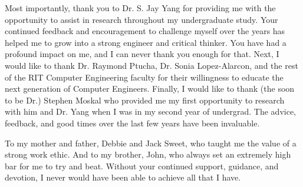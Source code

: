 %
%
%


\frontmatter


\begin{acknowledgments}
	\vfill
	\begin{center}
		\indent Most importantly, thank you to Dr. S. Jay Yang for providing me with the opportunity to assist in research throughout my undergraduate study. Your continued feedback and encouragement to challenge myself over the years has helped me to grow into a strong engineer and critical thinker. You have had a profound impact on me, and I can never thank you enough for that. Next, I would like to thank Dr. Raymond Ptucha, Dr. Sonia Lopez-Alarcon, and the rest of the RIT Computer Engineering faculty for their willingness to educate the next generation of Computer Engineers. Finally, I would like to thank (the soon to be Dr.) Stephen Moskal who provided me my first opportunity to research with him and Dr. Yang when I was in my second year of undergrad. The advice, feedback, and good times over the last few years have been invaluable. 
	\end{center}
	\vfill
\end{acknowledgments}


\begin{dedication}
	\vfill
	\begin{center}
		To my mother and father, Debbie and Jack Sweet, who taught me the value of a strong work ethic. And to my brother, John, who always set an extremely high bar for me to try and beat. Without your continued support, guidance, and devotion, I never would have been able to achieve all that I have. 
	\end{center}
	\vfill
\end{dedication}

